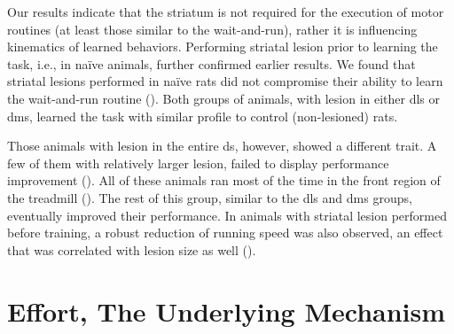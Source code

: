 Our results indicate that the striatum is not required for the execution of motor routines (at least those similar to the wait-and-run), rather it is influencing kinematics of learned behaviors.
Performing striatal lesion prior to learning the task, i.e., in na\"{i}ve animals, further confirmed earlier results.
We found that striatal lesions performed in na\"{i}ve rats did not compromise their ability to learn the wait-and-run routine ().
Both groups of animals, with lesion in either \gls{dls} or \gls{dms}, learned the task with similar profile to control (non-lesioned) rats.

Those animals with lesion in the entire \gls{ds}, however, showed a different trait.
A few of them with relatively larger lesion, failed to display performance improvement ().
All of these animals ran most of the time in the front region of the treadmill ().
The rest of this group, similar to the \gls{dls} and \gls{dms} groups, eventually improved their performance.
In animals with striatal lesion performed before training, a robust reduction of running speed was also observed, an effect that was correlated with lesion size as well ().


\section{Effort, The Underlying Mechanism}
\label{ch:lesion:effort}


